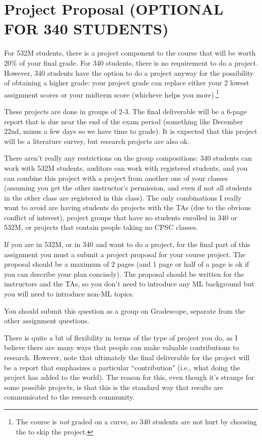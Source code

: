 \documentclass{article}
\def\blu#1{{\color{blu}#1}}
\begin{document}
\pagebreak

\section*{Project Proposal (OPTIONAL FOR 340 STUDENTS)}

For 532M students, there is a project component to the course that will be worth 20\% of your final grade. For 340 students, there is no requirement to do a project. However, 340 students have the option to do a project anyway for the possibility of obtaining a higher grade: your project grade can replace either your 2 lowest assignment scores or your midterm score (whicheve helps you more).\footnote{The course is \emph{not} graded on a curve, so 340 students are not hurt by choosing the to skip the project.}

These projects are done in \blu{groups of 2-3}. The final deliverable will be a \blu{6-page report that is due near the end of the exam period} (something like December 22nd, minus a few days so we have time to grade). It is expected that this project will be a literature survey, but research projects are also ok.

There aren't really any restrictions on the group compositions: 340 students can work with 532M students, auditors can work with registered students, and you can combine this project with a project from another one of your classes (assuming you get the other instructor's permission, and even if not all students in the other class are registered in this class). The only combinations I really want to avoid are having students do projects with the TAs (due to the obvious conflict of interest), project groups that have no students enrolled in 340 or 532M, or projects that contain people taking no CPSC classes.

If you are in 532M, or in 340 and want to do a project, for the final part of this assignment you must a \blu{submit a project proposal} for your course project. The proposal should be a maximum of 2 pages (and 1 page or half of a page is ok if you can describe your plan concisely). The proposal should be written for the instructors and the TAs, so you don't need to introduce any ML background but you will need to introduce non-ML topics.

\blu{You should submit this question as a group on Gradescope, separate from the other assignment questions.}

There is quite a bit of flexibility in terms of the type of project you do, as I believe there are many ways that people can make valuable contributions to research. However, note that ultimately the final deliverable for the project will be a report that emphasizes a particular ``contribution" (i.e., what doing the project has added to the world).
The reason for this, even though it's strange for some possible projects, is that this is the standard way that results are communicated to the research community.
\end{document}
